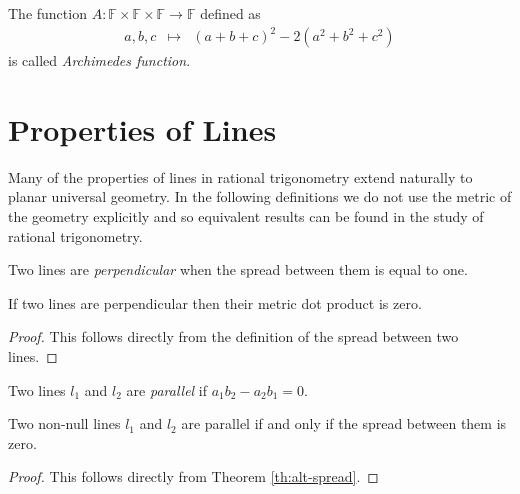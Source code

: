 \begin{definition}
The function $A : \mathbb{F}\times\mathbb{F}\times\mathbb{F} \to \mathbb{F}$ defined as
\begin{eqnarray}
a, b, c & \mapsto & (a + b + c)^2 - 2(a^2 + b^2 + c^2)\label{eq:arch}
\end{eqnarray}
is called \emph{Archimedes function}\cite{thebook}.
\end{definition}

\section{Properties of Lines}

Many of the properties of lines in rational trigonometry extend naturally to planar universal geometry.
In the following definitions we do not use the metric of the geometry explicitly and so equivalent results can be found in the study of rational trigonometry\cite{thebook}.

\begin{definition} Two lines are \emph{perpendicular} when the spread between them is equal to one.
\end{definition}

\begin{corollary} If two lines are perpendicular then their metric dot product is zero.
\end{corollary}
\begin{proof}This follows directly from the definition of the spread between two lines.
\end{proof}

\begin{definition} Two lines $l_1$ and $l_2$ are \emph{parallel} if $a_1b_2 - a_2b_1 = 0$.
\end{definition}
\begin{corollary} Two non-null lines $l_1$ and $l_2$ are parallel if and only if the spread between them is zero.
\end{corollary}
\begin{proof}This follows directly from Theorem \ref{th:alt-spread}.
\end{proof}

